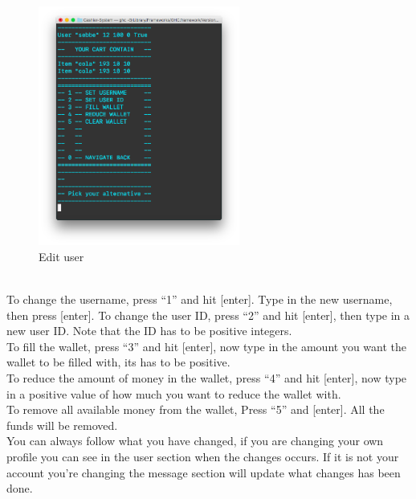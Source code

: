 \documentclass[11pt]{article}
\begin{document}
\\
\begin{figure}[h!]
  \includegraphics[width=250px]{interface8.png}
  \caption{Edit user}
\end{figure}
\\
\newpage
To change the username, press “1” and hit [enter]. Type in the new username, then press [enter].
To change the user ID, press “2” and hit [enter],  then type in a new user ID. Note that the ID has to be positive integers.\\
To fill the wallet, press “3” and hit [enter], now type in the amount you want the wallet to be filled with, its has to be positive.\\
To reduce the amount of money in the wallet, press “4” and hit [enter], now type in a positive value of how much you want to reduce the wallet with.\\
To remove all available money from the wallet, Press “5” and [enter].  All the funds will be removed.\\
You can always follow what you have changed, if you are changing your own profile you can see in the user section when the changes occurs. If it is not your account you’re changing the message section will update what changes has been done.\\\\
\end{document}
